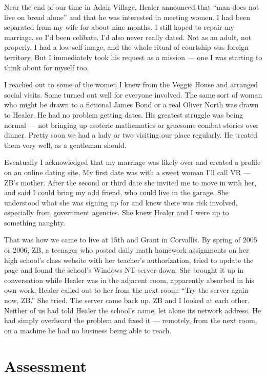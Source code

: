 Near the end of our time in Adair Village, Healer announced that ``man does not live on bread alone'' and that he was interested in meeting women. I had been separated from my wife for about nine months. I still hoped to repair my marriage, so I'd been celibate. I'd also never really dated. Not as an adult, not properly. I had a low self-image, and the whole ritual of courtship was foreign territory. But I immediately took his request as a mission --- one I was starting to think about for myself too.

I reached out to some of the women I knew from the Veggie House and arranged social visits. Some turned out well for everyone involved. The same sort of woman who might be drawn to a fictional James Bond or a real Oliver North was drawn to Healer. He had no problem getting dates. His greatest struggle was being normal --- not bringing up esoteric mathematics or gruesome combat stories over dinner. Pretty soon we had a lady or two visiting our place regularly. He treated them very well, as a gentleman should.

Eventually I acknowledged that my marriage was likely over and created a profile on an online dating site. My first date was with a sweet woman I'll call VR --- ZB's mother. After the second or third date she invited me to move in with her, and said I could bring my odd friend, who could live in the garage. She understood what she was signing up for and knew there was risk involved, especially from government agencies. She knew Healer and I were up to something naughty.

That was how we came to live at 15th and Grant in Corvallis. By spring of 2005 or 2006, ZB, a teenager who posted daily math homework assignments on her high school's class website with her teacher's authorization, tried to update the page and found the school's Windows NT server down. She brought it up in conversation while Healer was in the adjacent room, apparently absorbed in his own work. Healer called out to her from the next room: ``Try the server again now, ZB.'' She tried. The server came back up. ZB and I looked at each other. Neither of us had told Healer the school's name, let alone its network address. He had simply overheard the problem and fixed it --- remotely, from the next room, on a machine he had no business being able to reach.

\section*{Assessment}
\label{record:af-assessment}

